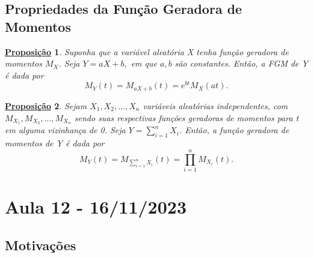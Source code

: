 \documentclass{article}
\newtheorem*{prop*}{\underline{Proposi\c c\~ao}}
\begin{document}
\subsection{Propriedades da Função Geradora de Momentos}
\begin{prop*}
  Suponha que a variável aleatória X tenha função geradora de momentos \(M_{X}\). Seja \(Y = aX + b,\) em que \(a, b\) são constantes.
Então, a FGM de Y é dada por 
  \[
    M_{Y}(t) = M_{aX + b}(t) = e^{bt}M_{X}(at).
  \]
\end{prop*}
\begin{prop*}
  Sejam \(X_{1}, X_{2}, \dotsc, X_{n}\) variáveis aleatórias independentes, com 
 \(M_{X_{1}}, M_{X_{2}}, \dotsc, M_{X_{n}}\) sendo suas respectivas funções geradoras de momentos para t em alguma vizinhança de 0.
 Seja  \(Y = \sum\limits_{i=1}^{n}X_{i}\). Então, a função geradora de momentos de Y é dada por 
  \[
    M_{Y}(t) = M_{\sum\limits_{i=1}^{n}X_{i}}(t) = \prod\limits_{i=1}^{n}M_{X_{i}}(t).
  \]
\end{prop*} 
\newpage

\section{Aula 12 - 16/11/2023}
\subsection{Motivações}

\newpage
\end{document}
